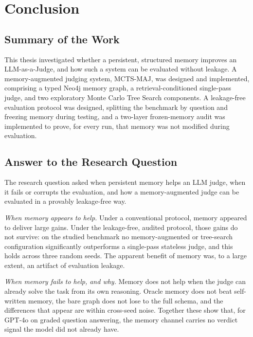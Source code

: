 \documentclass[14pt,a4paper]{extreport}
\begin{document}
\chapter{Conclusion}

\section{Summary of the Work}

This thesis investigated whether a persistent, structured memory improves an LLM-as-a-Judge, and how such a system can be evaluated without leakage. A memory-augmented judging system, MCTS-MAJ, was designed and implemented, comprising a typed Neo4j memory graph, a retrieval-conditioned single-pass judge, and two exploratory Monte Carlo Tree Search components. A leakage-free evaluation protocol was designed, splitting the benchmark by question and freezing memory during testing, and a two-layer frozen-memory audit was implemented to prove, for every run, that memory was not modified during evaluation.

\section{Answer to the Research Question}

The research question asked when persistent memory helps an LLM judge, when it fails or corrupts the evaluation, and how a memory-augmented judge can be evaluated in a provably leakage-free way.

\emph{When memory appears to help.} Under a conventional protocol, memory appeared to deliver large gains. Under the leakage-free, audited protocol, those gains do not survive: on the studied benchmark no memory-augmented or tree-search configuration significantly outperforms a single-pass stateless judge, and this holds across three random seeds. The apparent benefit of memory was, to a large extent, an artifact of evaluation leakage.

\emph{When memory fails to help, and why.} Memory does not help when the judge can already solve the task from its own reasoning. Oracle memory does not beat self-written memory, the bare graph does not lose to the full schema, and the differences that appear are within cross-seed noise. Together these show that, for GPT-4o on graded question answering, the memory channel carries no verdict signal the model did not already have.
\end{document}
